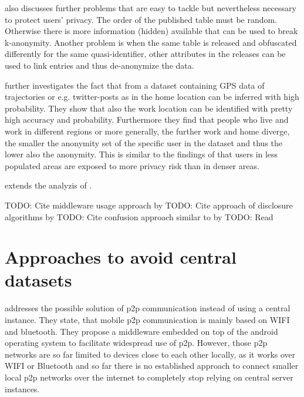 \parencite{k-anonymity} also discusses further problems that are easy to tackle but nevertheless necessary to protect users' privacy. The order of the published table must be random. Otherwise there is more information (hidden) available that can be used to break k-anonymity. Another problem is when the same table is released and obfuscated differently for the same quasi-identifier, other attributes in the releases can be used to link entries and thus de-anonymize the data.

\parencite{privacy-home-work-pairs} further investigates the fact that from a dataset containing GPS data of trajectories or e.g. twitter-posts as in \parencite{twitter} the home location can be inferred with high probability. They show that also the work location can be identified with pretty high accuracy and probability. Furthermore they find that people who live and work in different regions or more generally, the further work and home diverge, the smaller the anonymity set of the specific user in the dataset and thus the lower also the anonymity. This is similar to the findings of \parencite{location-privacy} that users in less populated areas are exposed to more privacy risk than in denser areas.

\parencite{mix-zones} extends the analyzis of \parencite{location-privacy}.

TODO: Cite middleware usage approach by \parencite{gruteser2003anonymous}
TODO: Cite approach of disclosure algorithms by \parencite{gruteser2005anonymity}
TODO: Cite confusion approach similar to \parencite{time-to-confusion} by \parencite{hoh2005protecting}
TODO: Read \parencite{tang2006putting}

\section{Approaches to avoid central datasets}

\parencite{p2p-android} addresses the possible solution of p2p communication instead of using a central instance. They state, that mobile p2p communication is mainly based on WIFI and bluetooth. They propose a middleware embedded on top of the android operating system to facilitate widespread use of p2p. However, those p2p networks are so far limited to devices close to each other locally, as it works over WIFI or Bluetooth and so far there is no established approach to connect smaller local p2p networks over the internet to completely stop relying on central server instances.

